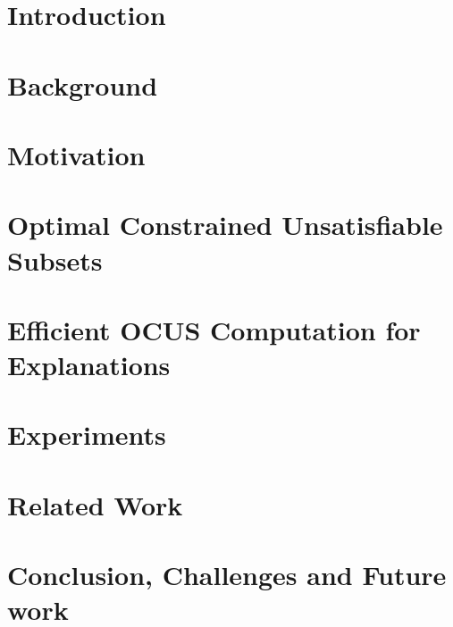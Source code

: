 \documentclass{article}
\begin{document}
\section{Introduction}


\section{Background}\label{sec:backgr}\label{sec:background}


\section{Motivation}\label{sec:motivation}\label{sec:motviation}


\section{Optimal Constrained Unsatisfiable Subsets} \label{sec:ocus}


\section{Efficient OCUS Computation for Explanations}\label{sec:ocusEx}


\section{Experiments}\label{sec:experiments}


\section{Related Work}\label{sec:related}


\section{Conclusion, Challenges and Future work}\label{sec:conclusion}




{

 
}
% 
\end{document}
